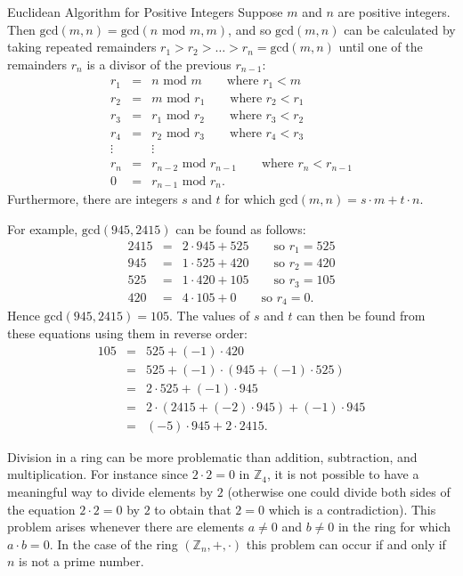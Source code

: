 \begin{theorem}{Euclidean Algorithm for Positive Integers}
  Suppose $m$ and $n$ are positive integers. Then
  $\mbox{gcd}(m,n)=\mbox{gcd}(n \mbox{ mod } m, m)$,
  and so $\mbox{gcd}(m,n)$ can be calculated by taking repeated remainders
  $r_1>r_2>\dots>r_n=\mbox{gcd}(m,n)$ until one of the remainders $r_n$ is a divisor
  of the previous $r_{n-1}$:
  \begin{eqnarray*}
    r_1 &=& n \mbox{ mod } m \qquad\mbox{where $r_1<m$} \\
    r_2 &=& m \mbox{ mod } r_1 \qquad\mbox{where $r_2<r_1$} \\
    r_3 &=& r_1 \mbox{ mod } r_2 \qquad\mbox{where $r_3<r_2$} \\
    r_4 &=& r_2 \mbox{ mod } r_3 \qquad\mbox{where $r_4<r_3$} \\
    \vdots && \vdots \\
    r_n &=& r_{n-2} \mbox{ mod } r_{n-1} \qquad\mbox{where $r_n<r_{n-1}$} \\
    0 &=& r_{n-1} \mbox{ mod } r_n.
  \end{eqnarray*}
  Furthermore, there are integers $s$ and $t$ for which $\mbox{gcd}(m,n)=s\cdot m+t\cdot n$.
\end{theorem}

For example, $\mbox{gcd}(945,2415)$ can be found as follows:
\begin{eqnarray*}
  2415 &=& 2\cdot945+525 \qquad\mbox{so $r_1=525$} \\
  945 &=& 1\cdot525+420 \qquad\mbox{so $r_2=420$} \\
  525 &=& 1\cdot420+105 \qquad\mbox{so $r_3=105$} \\
  420 &=& 4\cdot105+0 \qquad\mbox{so $r_4=0$}.
\end{eqnarray*}
Hence $\mbox{gcd}(945,2415)=105$.
The values of $s$ and $t$ can then be found from these equations using them in reverse order:
\begin{eqnarray*}
  105 &=& 525 + (-1)\cdot420 \\
  &=& 525 + (-1)\cdot(945+(-1)\cdot525) \\
  &=& 2\cdot525+(-1)\cdot945 \\
  &=& 2\cdot(2415+(-2)\cdot945)+(-1)\cdot945 \\
  &=& (-5)\cdot945+2\cdot2415.
\end{eqnarray*}

Division in a ring can be more problematic than addition, subtraction, and multiplication.
For instance since $2\cdot2=0$ in $\mathbb{Z}_4$, it is not possible to
have a meaningful way to divide elements by $2$ (otherwise one could divide both
sides of the equation $2\cdot2=0$ by $2$ to obtain that $2=0$ which is a contradiction).
This problem arises whenever there are elements $a\neq0$ and
$b\neq0$ in the ring for which $a\cdot b=0$.
In the case of the ring $(\mathbb{Z}_n,+,\cdot)$ this problem can occur if and only if
$n$ is not a prime number.

